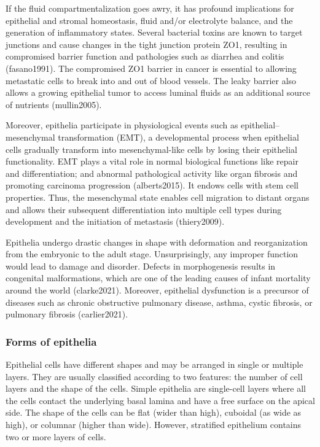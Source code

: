\documentclass[
]{article}
\begin{document}
If the fluid compartmentalization goes awry, it has profound
implications for epithelial and stromal homeostasis, fluid and/or
electrolyte balance, and the generation of inflammatory states. Several
bacterial toxins are known to target junctions and cause changes in the
tight junction protein ZO1, resulting in compromised barrier function
and pathologies such as diarrhea and colitis (fasano1991). The
compromised ZO1 barrier in cancer is essential to allowing metastatic
cells to break into and out of blood vessels. The leaky barrier also
allows a growing epithelial tumor to access luminal fluids as an
additional source of nutrients (mullin2005).

Moreover, epithelia participate in physiological events such as
epithelial--mesenchymal transformation (EMT), a developmental process
when epithelial cells gradually transform into mesenchymal-like cells by
losing their epithelial functionality. EMT plays a vital role in normal
biological functions like repair and differentiation; and abnormal
pathological activity like organ fibrosis and promoting carcinoma
progression (alberts2015). It endows cells with stem cell properties.
Thus, the mesenchymal state enables cell migration to distant organs and
allows their subsequent differentiation into multiple cell types during
development and the initiation of metastasis (thiery2009).

Epithelia undergo drastic changes in shape with deformation and
reorganization from the embryonic to the adult stage. Unsurprisingly,
any improper function would lead to damage and disorder. Defects in
morphogenesis results in congenital malformations, which are one of the
leading causes of infant mortality around the world (clarke2021).
Moreover, epithelial dysfunction is a precursor of diseases such as
chronic obstructive pulmonary disease, asthma, cystic fibrosis, or
pulmonary fibrosis (carlier2021).

\hypertarget{forms-of-epithelia}{%
\subsubsection{Forms of epithelia}\label{forms-of-epithelia}}

Epithelial cells have different shapes and may be arranged in single or
multiple layers. They are usually classified according to two features:
the number of cell layers and the shape of the cells. Simple epithelia
are single-cell layers where all the cells contact the underlying basal
lamina and have a free surface on the apical side. The shape of the
cells can be flat (wider than high), cuboidal (as wide as high), or
columnar (higher than wide). However, stratified epithelium contains two
or more layers of cells.
\end{document}
